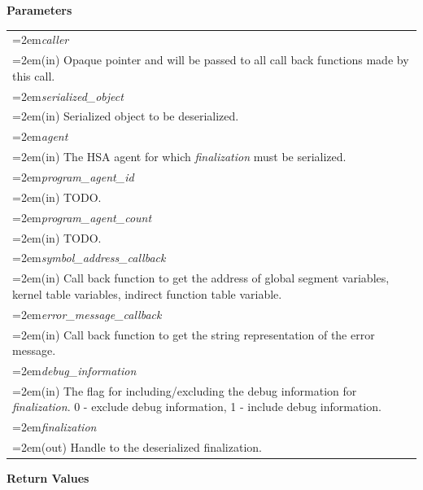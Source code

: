 \documentclass[final]{book}
\newcommand{\hsaarg}[1]{\textit{#1}}
\begin{document}
\noindent\textbf{Parameters}\\[-6mm]
\noindent\begin{longtable}{@{}>{\hangindent=2em}p{\textwidth}}
\hsaarg{caller}\\\hspace{2em}(in) Opaque pointer and will be passed to all call back functions made by this call.\\[2mm]
\hsaarg{serialized_\-object}\\\hspace{2em}(in) Serialized object to be deserialized.\\[2mm]
\hsaarg{agent}\\\hspace{2em}(in) The HSA agent for which \textit{finalization} must be serialized.\\[2mm]
\hsaarg{program_\-agent_\-id}\\\hspace{2em}(in) TODO.\\[2mm]
\hsaarg{program_\-agent_\-count}\\\hspace{2em}(in) TODO.\\[2mm]
\hsaarg{symbol_\-address_\-callback}\\\hspace{2em}(in) Call back function to get the address of global segment variables, kernel table variables, indirect function table variable.\\[2mm]
\hsaarg{error_\-message_\-callback}\\\hspace{2em}(in) Call back function to get the string representation of the error message.\\[2mm]
\hsaarg{debug_\-information}\\\hspace{2em}(in) The flag for including/excluding the debug information for \textit{finalization}. 0 - exclude debug information, 1 - include debug information.\\[2mm]
\hsaarg{finalization}\\\hspace{2em}(out) Handle to the deserialized finalization.
\end{longtable}
\vspace{-5mm}\noindent\textbf{Return Values}\\[-6mm]
\end{document}
